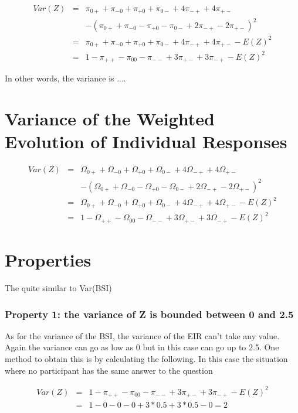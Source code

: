 \documentclass[12pt,a4paper,oneside]{book}
\begin{document}
\begin{eqnarray}
Var(Z) &=& \pi_{0+} + \pi_{-0} + \pi_{+0} + \pi_{0-} +4\pi_{-+} +4\pi_{+-} \nonumber \\ 
&&    - (\pi_{0+} + \pi_{-0} - \pi_{+0} - \pi_{0-} +2\pi_{-+} -2\pi_{+-})^2  \\
&=& \pi_{0+} + \pi_{-0} + \pi_{+0} + \pi_{0-} +4\pi_{-+} +4\pi_{+-} - E(Z)^2  \\
&=& 1 - \pi_{++} - \pi_{00} - \pi_{--} + 3\pi_{+-} + 3\pi_{-+} - E(Z)^2
\end{eqnarray}

In other words, the variance is ....



\section{Variance of the Weighted Evolution of Individual Responses}


\begin{eqnarray}
Var(Z) &=& \Omega_{0+} + \Omega_{-0} + \Omega_{+0} + \Omega_{0-} +4\Omega_{-+} +4\Omega_{+-} \nonumber \nonumber \\ 
&&    - (\Omega_{0+} + \Omega_{-0} - \Omega_{+0} - \Omega_{0-} +2\Omega_{-+} -2\Omega_{+-})^2  \\
&=& \Omega_{0+} + \Omega_{-0} + \Omega_{+0} + \Omega_{0-} +4\Omega_{-+} +4\Omega_{+-} - E(Z)^2  \\
&=& 1 - \Omega_{++} - \Omega_{00} - \Omega_{--} + 3\Omega_{+-} + 3\Omega_{-+} - E(Z)^2
\end{eqnarray}


\section{Properties}

The 
quite similar to Var(BSI)


\subsubsection{Property 1: the variance of Z is bounded between 0 and 2.5}
As for the variance of the BSI, the variance of the EIR can't take any value.
Again the variance can go as low as 0 but in this case can go up to 2.5. One method to obtain this is by calculating the following. In this case the situation where no participant has the same answer to the question 

\begin{eqnarray}
Var(Z) &=& 1 - \pi_{++} - \pi_{00} - \pi_{--} + 3\pi_{+-} + 3\pi_{-+} - E(Z)^2 \nonumber \\
    &=& 1 - 0 - 0 - 0 + 3*0.5 + 3*0.5 - 0 = 2 \nonumber
\end{eqnarray}
\end{document}
